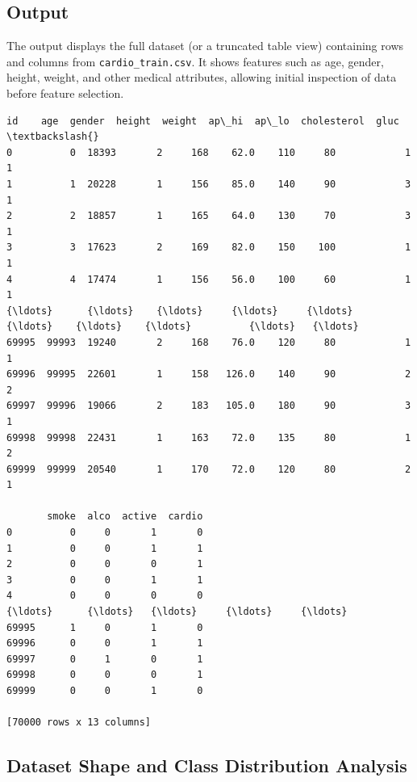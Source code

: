 \documentclass[11pt]{article}
\makeatletter
\newcommand{\boxspacing}{\kern\kvtcb@left@rule\kern\kvtcb@boxsep}
\newcommand{\prompt}[4]{
        {\ttfamily\llap{{\color{#2}[#3]:\hspace{3pt}#4}}\vspace{-\baselineskip}}
    }
\makeatother
\begin{document}
\subsection*{Output}
The output displays the full dataset (or a truncated table view) containing rows and columns from \texttt{cardio\_train.csv}. It shows features such as age, gender, height, weight, and other medical attributes, allowing initial inspection of data before feature selection.
            \begin{tcolorbox}[breakable, size=fbox, boxrule=.5pt, pad at break*=1mm, opacityfill=0]
\prompt{Out}{outcolor}{63}{\boxspacing}
\begin{Verbatim}[commandchars=\\\{\}]
          id    age  gender  height  weight  ap\_hi  ap\_lo  cholesterol  gluc  \textbackslash{}
0          0  18393       2     168    62.0    110     80            1     1
1          1  20228       1     156    85.0    140     90            3     1
2          2  18857       1     165    64.0    130     70            3     1
3          3  17623       2     169    82.0    150    100            1     1
4          4  17474       1     156    56.0    100     60            1     1
{\ldots}      {\ldots}    {\ldots}     {\ldots}     {\ldots}     {\ldots}    {\ldots}    {\ldots}          {\ldots}   {\ldots}
69995  99993  19240       2     168    76.0    120     80            1     1
69996  99995  22601       1     158   126.0    140     90            2     2
69997  99996  19066       2     183   105.0    180     90            3     1
69998  99998  22431       1     163    72.0    135     80            1     2
69999  99999  20540       1     170    72.0    120     80            2     1

       smoke  alco  active  cardio
0          0     0       1       0
1          0     0       1       1
2          0     0       0       1
3          0     0       1       1
4          0     0       0       0
{\ldots}      {\ldots}   {\ldots}     {\ldots}     {\ldots}
69995      1     0       1       0
69996      0     0       1       1
69997      0     1       0       1
69998      0     0       0       1
69999      0     0       1       0

[70000 rows x 13 columns]
\end{Verbatim}
\end{tcolorbox}


\subsection{Dataset Shape and Class Distribution Analysis}
\end{document}
